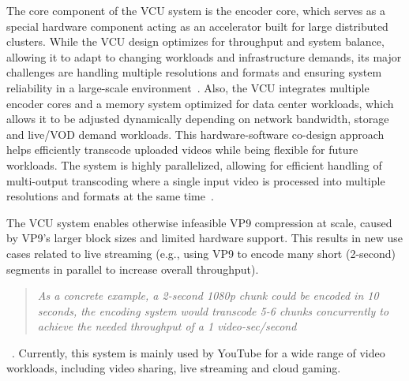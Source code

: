 \noindent The core component of the \ac{VCU} system is the encoder core, which serves as a special hardware component acting as an accelerator built for large distributed clusters. 
While the \ac{VCU} design optimizes for throughput and system balance, allowing it to adapt to changing workloads and infrastructure demands, its major challenges are handling multiple resolutions and formats and ensuring system reliability in a large-scale environment~\parencite{youtube_vpu}.
Also, the \ac{VCU} integrates multiple encoder cores and a memory system optimized for data center workloads, which allows it to be adjusted dynamically depending on network bandwidth, storage and live/\ac{VOD} demand workloads. This hardware-software co-design approach helps efficiently transcode uploaded videos while being flexible for future workloads. The system is highly parallelized, allowing for efficient handling of multi-output transcoding where a single input video is processed into multiple resolutions and formats at the same time~\parencite{youtube_vpu}.

The \ac{VCU} system enables otherwise infeasible VP9 compression at scale, caused by VP9's larger block sizes and limited hardware support. This results in new use cases related to live streaming (e.g., using VP9 to encode many short (2-second) segments in parallel to increase overall throughput). \blockquote{\textit{As a concrete example, a 2-second 1080p chunk could be encoded in 10 seconds, the encoding system would transcode 5-6 chunks concurrently to achieve the needed throughput of a 1 video-sec/second}}~\parencite{youtube_vpu}.
Currently, this system is mainly used by YouTube for a wide range of video workloads, including video sharing, live streaming and cloud gaming. 